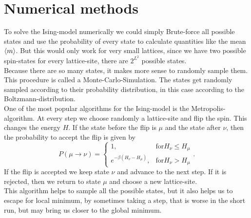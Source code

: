 \section{Numerical methods}
To solve the Ising-model numerically we could simply Brute-force all possible states and use the probability of every state to calculate quantities like the mean $\left\langle m\right\rangle$. But this would only work for very small lattices, since we have two possible spin-states for every lattice-site, there are $2^{L^2}$ possible states.\\
Because there are so many states, it makes more sense to randomly sample them. This procedure is called a Monte-Carlo-Simulation. The states get randomly sampled according to their probability distribution, in this case according to the Boltzmann-distribution.\\
One of the most popular algorithms for the Ising-model is the Metropolis-algorithm. At every step we choose randomly a lattice-site and flip the spin. This changes the energy $H$. If the state before the flip is $\mu$ and the state after $\nu$, then the probability to accept the flip is given by
\begin{equation}
  P(\mu \rightarrow \nu) =
  \begin{cases}
    1 , & \text{for} H_{\nu} \leq H_{\mu} \\
    e^{-\beta (H_{\nu} - H_{\mu})}, & \text{for} H_{\nu} > H_{\mu}
  \end{cases}.
\end{equation}
If the flip is accepted we keep state $\nu$ and advance to the next step. If it is rejected, then we return to state $\mu$ and choose a new lattice-site.\\
This algorithm helps to sample all the possible states, but it also helps us to escape for local minimum, by sometimes taking a step, that is worse in the short run, but may bring us closer to the global minimum.\\

